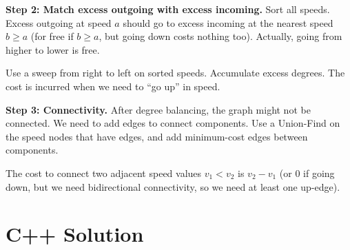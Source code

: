 \documentclass[11pt,a4paper]{article}
\begin{document}
\textbf{Step 2: Match excess outgoing with excess incoming.} Sort all speeds. Excess outgoing at speed $a$ should go to excess incoming at the nearest speed $b \ge a$ (for free if $b \ge a$, but going down costs nothing too). Actually, going from higher to lower is free.

Use a sweep from right to left on sorted speeds. Accumulate excess degrees. The cost is incurred when we need to ``go up'' in speed.

\textbf{Step 3: Connectivity.} After degree balancing, the graph might not be connected. We need to add edges to connect components. Use a Union-Find on the speed nodes that have edges, and add minimum-cost edges between components.

The cost to connect two adjacent speed values $v_1 < v_2$ is $v_2 - v_1$ (or 0 if going down, but we need bidirectional connectivity, so we need at least one up-edge).

\section{C++ Solution}
\end{document}
